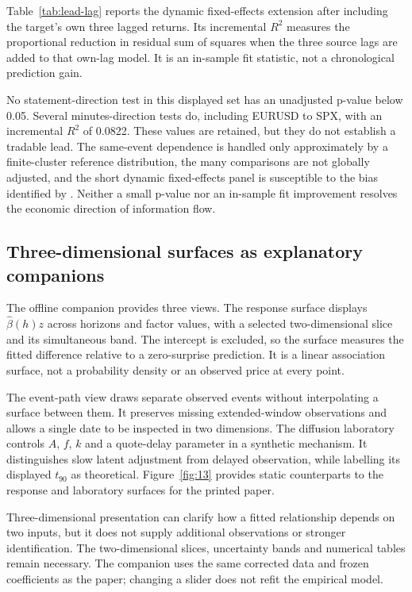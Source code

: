 Table~\ref{tab:lead-lag} reports the dynamic fixed-effects extension after including the target's own three lagged returns. Its incremental $R^2$ measures the proportional reduction in residual sum of squares when the three source lags are added to that own-lag model. It is an in-sample fit statistic, not a chronological prediction gain.


No statement-direction test in this displayed set has an unadjusted p-value below 0.05. Several minutes-direction tests do, including EURUSD to SPX, with an incremental $R^2$ of 0.0822. These values are retained, but they do not establish a tradable lead. The same-event dependence is handled only approximately by a finite-cluster reference distribution, the many comparisons are not globally adjusted, and the short dynamic fixed-effects panel is susceptible to the bias identified by . Neither a small p-value nor an in-sample fit improvement resolves the economic direction of information flow.

\subsection{Three-dimensional surfaces as explanatory companions}
The offline companion provides three views. The response surface displays $\hat\beta(h)z$ across horizons and factor values, with a selected two-dimensional slice and its simultaneous band. The intercept is excluded, so the surface measures the fitted difference relative to a zero-surprise prediction. It is a linear association surface, not a probability density or an observed price at every point.

The event-path view draws separate observed events without interpolating a surface between them. It preserves missing extended-window observations and allows a single date to be inspected in two dimensions. The diffusion laboratory controls $A$, $f$, $k$ and a quote-delay parameter in a synthetic mechanism. It distinguishes slow latent adjustment from delayed observation, while labelling its displayed $t_{90}$ as theoretical. Figure~\ref{fig:13} provides static counterparts to the response and laboratory surfaces for the printed paper.


Three-dimensional presentation can clarify how a fitted relationship depends on two inputs, but it does not supply additional observations or stronger identification. The two-dimensional slices, uncertainty bands and numerical tables remain necessary. The companion uses the same corrected data and frozen coefficients as the paper; changing a slider does not refit the empirical model.

